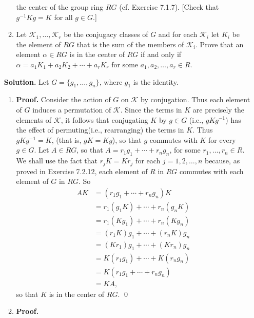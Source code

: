 \begin{enumerate}
\begin{enumerate}
                           the center of the group ring $RG$
                           (cf. Exercise 7.1.7). [Check that $g^{-1}Kg = K$ for
                           all $g \in G$.]
                     \item Let $\mathcal{K}_1, \ldots, \mathcal{K}_r$ be the
                           conjugacy classes of $G$ and for each $\mathcal{K}_i$
                           let $K_i$ be the element of $RG$ that is the sum of
                           the members of $\mathcal{K}_i$. Prove that an element
                           $\alpha \in RG$ is in the center of $RG$ if and only
                           if $\alpha = a_1K_1 + a_2K_2 + \cdots + a_rK_r$ for
                           some $a_1, a_2, \ldots, a_r \in R$.
                  \end{enumerate}

      \textbf{Solution.} Let $G = \{g_1, \ldots, g_n\}$, where $g_1$ is the
      identity.

      \begin{enumerate}
         \item \textbf{Proof.} Consider the action of $G$ on $\mathcal{K}$ by
               conjugation. Thus each element of $G$ induces a permutation of
               $\mathcal{K}$. Since the terms in $K$ are precisely the elements
               of $\mathcal{K}$, it follows that conjugating $K$ by $g \in G$
               (i.e., $gKg^{-1}$) has the effect of permuting(i.e., rearranging)
               the terms in $K$. Thus $gKg^{-1} = K$, (that is, $gK = Kg$), so
               that $g$ commutes with $K$ for every $g \in G$. Let $A \in RG$,
               so that $A = r_1g_1 + \cdots + r_ng_n$, for some
               $r_1, \ldots, r_n \in R$. We shall use the fact that
               $r_jK = Kr_j$ for each $j = 1, 2, \ldots, n$ because, as proved
               in Exercise 7.2.12, each element of $R$ in $RG$ commutes with
               each element of $G$ in $RG$. So
               \begin{align*}
                  AK &= (r_1g_1 + \cdots + r_ng_n)K \\
                     &= r_1(g_1K) + \cdots + r_n(g_nK) \\
                     &= r_1(Kg_1) + \cdots + r_n(Kg_n) \\
                     &= (r_1K)g_1 + \cdots + (r_nK)g_n \\
                     &= (Kr_1)g_1 + \cdots + (Kr_n)g_n \\
                     &= K(r_1g_1) + \cdots + K(r_ng_n) \\
                     &= K(r_1g_1 + \cdots + r_ng_n) \\
                     &= KA,
               \end{align*}
               so that $K$ is in the center of $RG$. \qed
         \item \textbf{Proof.}


\end{enumerate}
\end{enumerate}
